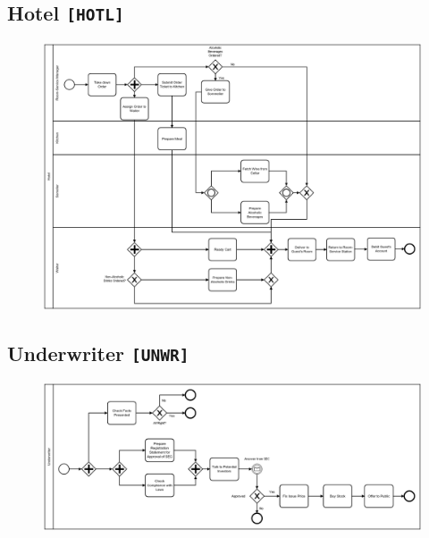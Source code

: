 \clearpage


\begin{landscape}
\thispagestyle{empty}
\section*{Hotel \texttt{[HOTL]}}
\begin{figure}[!h]
    \centering
    \includegraphics[width=1.3\textwidth]{figures/benchmark/Hotel.png}
\end{figure}
\end{landscape}

\clearpage


\begin{landscape}
\thispagestyle{empty}
\section*{Underwriter \texttt{[UNWR]}}
\begin{figure}[!h]
    \centering
    \includegraphics[width=1.3\textwidth]{figures/benchmark/Underwriter.png}
\end{figure}
\end{landscape}

